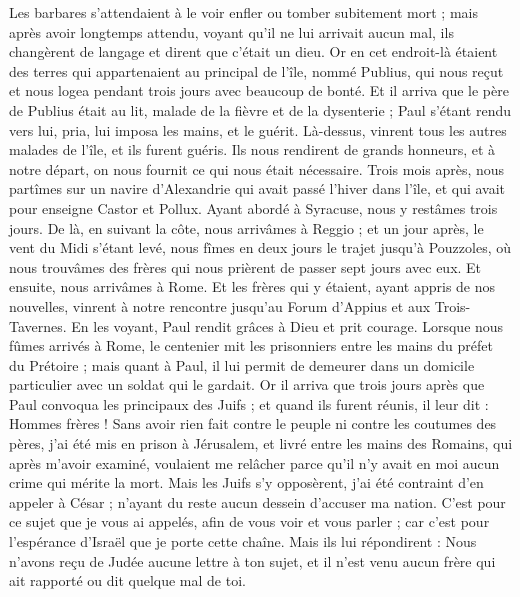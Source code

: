 \begin{multicols}{2}
Les barbares s’attendaient à le voir enfler ou tomber subitement mort ; mais après avoir longtemps attendu, voyant qu’il ne lui arrivait aucun mal, ils changèrent de langage et dirent que c’était un dieu.
Or en cet endroit-là étaient des terres qui appartenaient au principal de l'île, nommé Publius, qui nous reçut et nous logea pendant trois jours avec beaucoup de bonté.
Et il arriva que le père de Publius était au lit, malade de la fièvre et de la dysenterie ; Paul s’étant rendu vers lui, pria, lui imposa les mains, et le guérit.
Là-dessus, vinrent tous les autres malades de l'île, et ils furent guéris.
Ils nous rendirent de grands honneurs, et à notre départ, on nous fournit ce qui nous était nécessaire.
Trois mois après, nous partîmes sur un navire d'Alexandrie qui avait passé l’hiver dans l'île, et qui avait pour enseigne Castor et Pollux.
Ayant abordé à Syracuse, nous y restâmes trois jours.
De là, en suivant la côte, nous arrivâmes à Reggio ; et un jour après, le vent du Midi s'étant levé, nous fîmes en deux jours le trajet jusqu’à Pouzzoles,
où nous trouvâmes des frères qui nous prièrent de passer sept jours avec eux. Et ensuite, nous arrivâmes à Rome.
Et les frères qui y étaient, ayant appris de nos nouvelles, vinrent à notre rencontre jusqu’au Forum d'Appius et aux Trois-Tavernes. En les voyant, Paul rendit grâces à Dieu et prit courage.
Lorsque nous fûmes arrivés à Rome, le centenier mit les prisonniers entre les mains du préfet du Prétoire ; mais quant à Paul, il lui permit de demeurer dans un domicile particulier avec un soldat qui le gardait.
Or il arriva que trois jours après que Paul convoqua les principaux des Juifs ; et quand ils furent réunis, il leur dit : Hommes frères ! Sans avoir rien fait contre le peuple ni contre les coutumes des pères, j'ai été mis en prison à Jérusalem, et livré entre les mains des Romains,
qui après m'avoir examiné, voulaient me relâcher parce qu'il n'y avait en moi aucun crime qui mérite la mort.
Mais les Juifs s'y opposèrent, j'ai été contraint d'en appeler à César ; n’ayant du reste aucun dessein d'accuser ma nation.
C’est pour ce sujet que je vous ai appelés, afin de vous voir et vous parler ; car c'est pour l'espérance d'Israël que je porte cette chaîne.
Mais ils lui répondirent : Nous n'avons reçu de Judée aucune lettre à ton sujet, et il n’est venu aucun frère qui ait rapporté ou dit quelque mal de toi.

\end{multicols}
